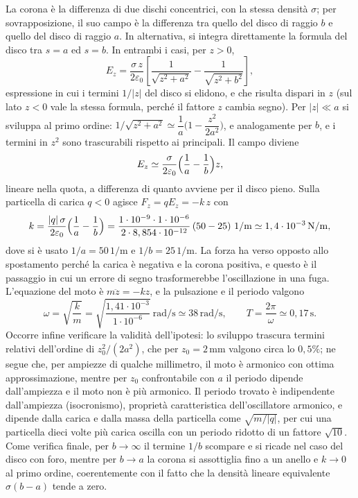 \documentclass[11pt,a4paper]{article}
\newcommand{\epz}{\varepsilon_0}
\begin{document}
La corona è la differenza di due dischi concentrici, con la stessa densità $\sigma$; per sovrapposizione, il suo campo è la differenza tra quello del disco di raggio $b$ e quello del disco di raggio $a$. In alternativa, si integra direttamente la formula del disco tra $s=a$ ed $s=b$. In entrambi i casi, per $z>0$,
\[
E_z=\frac{\sigma\,z}{2\epz}\left[\frac{1}{\sqrt{z^2+a^2}}-\frac{1}{\sqrt{z^2+b^2}}\right],
\]
espressione in cui i termini $1/|z|$ del disco si elidono, e che risulta dispari in $z$ (sul lato $z<0$ vale la stessa formula, perché il fattore $z$ cambia segno). Per $|z|\ll a$ si sviluppa al primo ordine: $1/\sqrt{z^2+a^2}\simeq\dfrac1a\bigl(1-\dfrac{z^2}{2a^2}\bigr)$, e analogamente per $b$, e i termini in $z^2$ sono trascurabili rispetto ai principali. Il campo diviene
\[
E_z\simeq\frac{\sigma}{2\epz}\Bigl(\frac1a-\frac1b\Bigr)z ,
\]
lineare nella quota, a differenza di quanto avviene per il disco pieno. Sulla particella di carica $q<0$ agisce $F_z=qE_z=-k\,z$ con
\[
k=\frac{|q|\,\sigma}{2\epz}\Bigl(\frac1a-\frac1b\Bigr)=\frac{\ensuremath{1\cdot 10^{-9}}\cdot\ensuremath{1\cdot 10^{-6}}}{2\cdot\ensuremath{8,854\cdot 10^{-12}}}\,(50-25)\ \ensuremath{\mathrm{1/m}}\simeq\ensuremath{1,4\cdot 10^{-3}\,\mathrm{N/m}},
\]
dove si è usato $1/a=\ensuremath{50\,\mathrm{1/m}}$ e $1/b=\ensuremath{25\,\mathrm{1/m}}$. La forza ha verso opposto allo spostamento perché la carica è negativa e la corona positiva, e questo è il passaggio in cui un errore di segno trasformerebbe l'oscillazione in una fuga. L'equazione del moto è $m\ddot z=-kz$, e la pulsazione e il periodo valgono
\[
\omega=\sqrt{\frac{k}{m}}=\sqrt{\frac{\ensuremath{1,41\cdot 10^{-3}}}{\ensuremath{1\cdot 10^{-6}}}}\ \ensuremath{\mathrm{rad/s}}\simeq\ensuremath{38\,\mathrm{rad/s}},\qquad
T=\frac{2\pi}{\omega}\simeq\ensuremath{0,17\,\mathrm{s}}.
\]
Occorre infine verificare la validità dell'ipotesi: lo sviluppo trascura termini relativi dell'ordine di $z_0^2/(2a^2)$, che per $z_0=\ensuremath{2\,\mathrm{mm}}$ valgono circa lo $0{,}5\%$; ne segue che, per ampiezze di qualche millimetro, il moto è armonico con ottima approssimazione, mentre per $z_0$ confrontabile con $a$ il periodo dipende dall'ampiezza e il moto non è più armonico. Il periodo trovato è indipendente dall'ampiezza (isocronismo), proprietà caratteristica dell'oscillatore armonico, e dipende dalla carica e dalla massa della particella come $\sqrt{m/|q|}$, per cui una particella dieci volte più carica oscilla con un periodo ridotto di un fattore $\sqrt{10}$. Come verifica finale, per $b\to\infty$ il termine $1/b$ scompare e si ricade nel caso del disco con foro, mentre per $b\to a$ la corona si assottiglia fino a un anello e $k\to0$ al primo ordine, coerentemente con il fatto che la densità lineare equivalente $\sigma(b-a)$ tende a zero.
\end{document}
